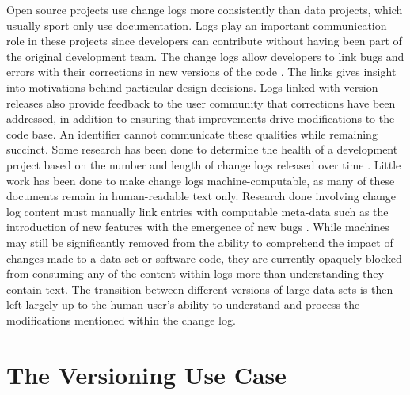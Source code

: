 Open source projects use change logs more consistently than data projects, which usually sport only use documentation.
Logs play an important communication role in these projects since developers can contribute without having been part of the original development team.
The change logs allow developers to link bugs and errors with their corrections in new versions of the code \cite{Chen:2004:OCL:990374.990391}.
The links gives insight into motivations behind particular design decisions.
Logs linked with version releases also provide feedback to the user community that corrections have been addressed, in addition to ensuring that improvements drive modifications to the code base.
An identifier cannot communicate these qualities while remaining succinct.
Some research has been done to determine the health of a development project based on the number and length of change logs released over time \cite{German03automatingthe}.
Little work has been done to make change logs machine-computable, as many of these documents remain in human-readable text only.
Research done involving change log content must manually link entries with computable meta-data such as the introduction of new features with the emergence of new bugs \cite{6132954}.
While machines may still be significantly removed from the ability to comprehend the impact of changes made to a data set or software code, they are currently opaquely blocked from consuming any of the content within logs more than understanding they contain text.
The transition between different versions of large data sets is then left largely up to the human user's ability to understand and process the modifications mentioned within the change log.

\section{The Versioning Use Case} \label{sec:usecase}

